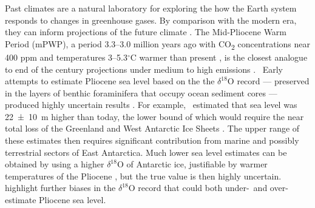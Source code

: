 Past climates are a natural laboratory for exploring the how the Earth system responds to changes in greenhouse gases. By comparison with the modern era, they can inform projections of the future climate \citep{tierneyClimatesInformOur2020}. The Mid-Pliocene Warm Period (mPWP), a period 3.3--3.0 million years ago with CO\textsubscript{2} concentrations near 400 ppm and temperatures 3--5.3$^\circ$C warmer than present \citep{tierneyPlioceneWarmthPatterns2025}, is the closest analogue to end of the century projections under medium to high emissions \citep{burkePlioceneEoceneProvide2018}.~ Early attempts to estimate Pliocene sea level based on the the $\delta^{18}$O record --- preserved in the layers of benthic foraminifera that occupy ocean sediment cores --- produced highly uncertain results \citep{duttonSealevelRiseDue2015}. For example,~\cite{millerHighTideWarm2012} estimated that sea level was 22~±~10~m higher than today, the lower bound of which would require the near total loss of the Greenland and West Antarctic Ice Sheets . The upper range of these estimates then requires significant contribution from marine and possibly terrestrial sectors of East Antarctica. Much lower sea level estimates can be obtained by using a higher $\delta^{18}$O of Antarctic ice, justifiable by warmer temperatures of the Pliocene \citep{winnickOxygenIsotopeMassbalance2015,gassonModelingOxygenIsotope2016}, but the true value is then highly uncertain.~\cite{raymoAccuracyMidPlioceneD18Obased2018} highlight further biases in the $\delta^{18}$O record that could both under-~and over-estimate Pliocene sea level.



